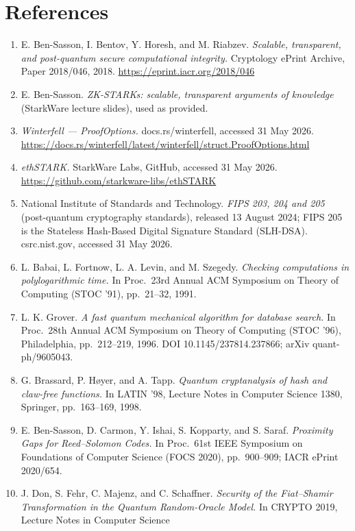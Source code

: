 \documentclass[11pt]{article}
\begin{document}
\section*{References}
\begin{enumerate}
\itemsep2pt
\item[{[1]}] E. Ben-Sasson, I. Bentov, Y. Horesh, and M. Riabzev. \emph{Scalable, transparent, and
post-quantum secure computational integrity.} Cryptology ePrint Archive, Paper 2018/046, 2018.
\url{https://eprint.iacr.org/2018/046}
\item[{[2]}] E. Ben-Sasson. \emph{ZK-STARKs: scalable, transparent arguments of knowledge} (StarkWare
lecture slides), used as provided.
\item[{[3]}] \emph{Winterfell --- ProofOptions.} docs.rs/winterfell, accessed 31 May 2026.
\url{https://docs.rs/winterfell/latest/winterfell/struct.ProofOptions.html}
\item[{[4]}] \emph{ethSTARK.} StarkWare Labs, GitHub, accessed 31 May 2026.
\url{https://github.com/starkware-libs/ethSTARK}
\item[{[5]}] National Institute of Standards and Technology. \emph{FIPS 203, 204 and 205}
(post-quantum cryptography standards), released 13 August 2024; FIPS 205 is the Stateless Hash-Based
Digital Signature Standard (SLH-DSA). csrc.nist.gov, accessed 31 May 2026.
\item[{[6]}] L. Babai, L. Fortnow, L. A. Levin, and M. Szegedy. \emph{Checking computations in
polylogarithmic time.} In Proc.\ 23rd Annual ACM Symposium on Theory of Computing (STOC '91), pp.\
21--32, 1991.
\item[{[7]}] L. K. Grover. \emph{A fast quantum mechanical algorithm for database search.} In Proc.\
28th Annual ACM Symposium on Theory of Computing (STOC '96), Philadelphia, pp.\ 212--219, 1996.
DOI 10.1145/237814.237866; arXiv quant-ph/9605043.
\item[{[8]}] G. Brassard, P. H\o yer, and A. Tapp. \emph{Quantum cryptanalysis of hash and claw-free
functions.} In LATIN '98, Lecture Notes in Computer Science 1380, Springer, pp.\ 163--169, 1998.
\item[{[9]}] E. Ben-Sasson, D. Carmon, Y. Ishai, S. Kopparty, and S. Saraf. \emph{Proximity Gaps for
Reed--Solomon Codes.} In Proc.\ 61st IEEE Symposium on Foundations of Computer Science (FOCS 2020),
pp.\ 900--909; IACR ePrint 2020/654.
\item[{[10]}] J. Don, S. Fehr, C. Majenz, and C. Schaffner. \emph{Security of the Fiat--Shamir
Transformation in the Quantum Random-Oracle Model.} In CRYPTO 2019, Lecture Notes in Computer Science

\end{enumerate}
\end{document}

